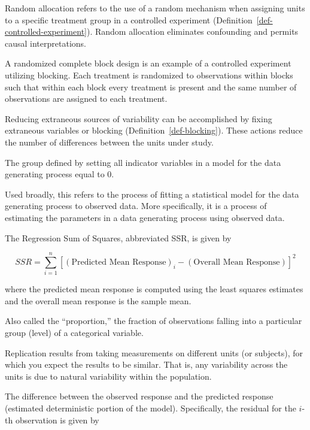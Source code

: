 \documentclass[
  letterpaper,
  DIV=11,
  numbers=noendperiod]{scrreprt}
\providecommand{\tightlist}{%
  \setlength{\itemsep}{0pt}\setlength{\parskip}{0pt}}\usepackage{longtable,booktabs,array}
\theoremstyle{definition}
\theoremstyle{definition}
\theoremstyle{plain}
\theoremstyle{remark}
\begin{document}
Random allocation refers to the use of a random mechanism when assigning
units to a specific treatment group in a controlled experiment
(Definition~\ref{def-controlled-experiment}). Random allocation
eliminates confounding and permits causal interpretations.

\begin{description}
\tightlist
\item[Randomized Complete Block Design (Definition~\ref{def-rcbd})]
A randomized complete block design is an example of a controlled
experiment utilizing blocking. Each treatment is randomized to
observations within blocks such that within each block every treatment
is present and the same number of observations are assigned to each
treatment.
\item[Reduction of Noise (Definition~\ref{def-noise-reduction})]
Reducing extraneous sources of variability can be accomplished by fixing
extraneous variables or blocking (Definition~\ref{def-blocking}). These
actions reduce the number of differences between the units under study.
\item[Reference Group (Definition~\ref{def-reference-group})]
The group defined by setting all indicator variables in a model for the
data generating process equal to 0.
\item[Regression (Definition~\ref{def-regression})]
Used broadly, this refers to the process of fitting a statistical model
for the data generating process to observed data. More specifically, it
is a process of estimating the parameters in a data generating process
using observed data.
\item[Regression Sum of Squares (Definition~\ref{def-ssr})]
The Regression Sum of Squares, abbreviated SSR, is given by
\end{description}

\[SSR = \sum_{i=1}^{n} \left[(\text{Predicted Mean Response})_i - (\text{Overall Mean Response})\right]^2\]

where the predicted mean response is computed using the least squares
estimates and the overall mean response is the sample mean.

\begin{description}
\tightlist
\item[Relative Frequency (Definition~\ref{def-relative-frequency})]
Also called the ``proportion,'' the fraction of observations falling
into a particular group (level) of a categorical variable.
\item[Replication (Definition~\ref{def-replication})]
Replication results from taking measurements on different units (or
subjects), for which you expect the results to be similar. That is, any
variability across the units is due to natural variability within the
population.
\item[Residual (Definition~\ref{def-residual})]
The difference between the observed response and the predicted response
(estimated deterministic portion of the model). Specifically, the
residual for the \(i\)-th observation is given by
\end{description}
\end{document}
